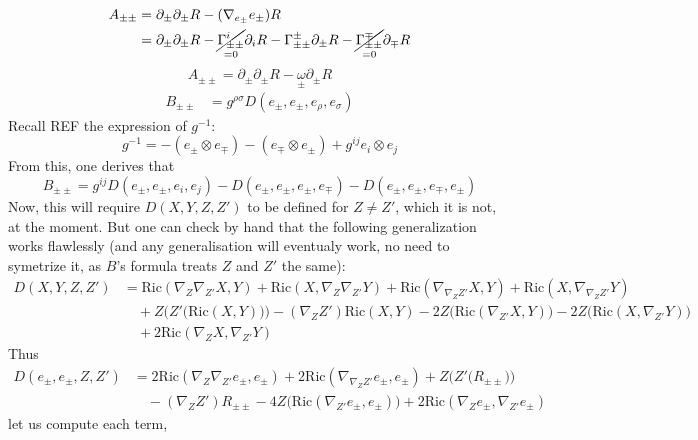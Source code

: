 \documentclass[a4paper,11pt]{article}
\numberwithin{equation}{section}
\theoremstyle{definition}
\newcommand{\R}{{\mathrm{Ric}}}
\begin{document}
\begin{align*}
    A_{\pm\pm} &= \partial_\pm \partial_\pm R - (\nabla_{e_\pm}e_\pm) R\\
    &= \partial_\pm \partial_\pm R - \underset{=0}{\cancel{\Gamma_{\pm\pm}^i}} \partial_i R - \Gamma_{\pm\pm}^\pm \partial_\pm R - \underset{=0}{\cancel{\Gamma_{\pm\pm}^\mp}} \partial_\mp R
\end{align*}
\begin{equation}
    \boxed{A_{\pm\pm} = \partial_\pm \partial_\pm R - \underset{\pm}{\omega}\partial_\pm R}
\end{equation}
\begin{align*}
    B_{\pm\pm}&= g^{\rho\sigma} D(e_\pm,e_\pm, e_\rho, e_\sigma)
\end{align*}
Recall \color{red} REF \color{black} the expression of $g^{-1}$:
$$g^{-1} = -(e_\pm \otimes e_\mp) - (e_\mp \otimes e_\pm) + g^{ij}e_i\otimes e_j $$
From this, one derives that 
$$B_{\pm\pm}=g^{ij}D(e_\pm,e_\pm, e_i, e_j) - D(e_\pm,e_\pm, e_\pm, e_\mp) - D(e_\pm,e_\pm, e_\mp, e_\pm) $$
Now, this will require $D(X,Y,Z,Z')$ to be defined for $Z\ne Z'$, which it is not, at the moment. But one can check by hand that the following generalization works flawlessly (and any generalisation will eventualy work, no need to symetrize it, as $B$'s formula treats $Z$ and $Z'$ the same):
\begin{align*}
    D(X,Y,Z,Z') 
    &=\R(\nabla_Z\nabla_{Z'} X ,Y )
    + \R( X ,\nabla_Z\nabla_{Z'} Y )
    + \R(\nabla_{\nabla_ZZ'} X , Y )
    + \R( X ,\nabla_{\nabla_ZZ'}Y )\\
    & \quad + Z\big(Z'\big(\R(X ,Y )\big)\big)-(\nabla_Z Z')\R(X ,Y )
    -2 Z\big(\R(\nabla_{Z'} X , Y )\big)
    -2 Z\big(\R(X , \nabla_{Z'} Y )\big) \\
    & \quad + 2 \R(\nabla_Z X , \nabla_{Z'} Y ) 
\end{align*} Thus \begin{align*}
    D(e_\pm,e_\pm,Z,Z') 
    &= 2 \R(\nabla_Z\nabla_{Z'} e_\pm ,e_\pm )
    + 2 \R(\nabla_{\nabla_ZZ'} e_\pm ,e_\pm )
    + Z\big(Z'\big(R_{\pm\pm}\big)\big)\\
    & \quad
    -(\nabla_Z Z') R_{\pm\pm}
    -4 Z\big(\R(\nabla_{Z'} e_\pm , e_\pm )\big)
    + 2 \R(\nabla_Z e_\pm , \nabla_{Z'} e_\pm )
\end{align*}
let us compute each term,
\end{document}
